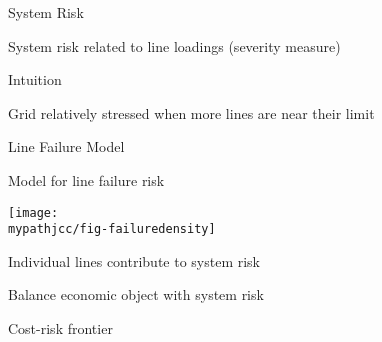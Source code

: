 \begin{frame}{System Risk}

System risk related to line loadings (severity measure) \footnotemark
\pause


\vspace{10pt}
Intuition
\bi
\item Grid relatively stressed when more lines are near their limit
\ei
\end{frame}
\begin{frame}{Line Failure Model}

Model for line failure risk

\begin{center}
\texttt{[image: \\mypathjcc/fig-failuredensity]}
\end{center}
\pause

Individual lines contribute to system risk
\bi
\item Balance economic object with system risk
\item Cost-risk frontier
\ei

\end{frame}





